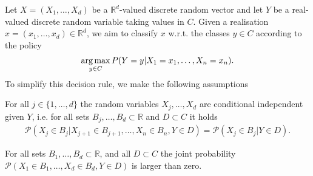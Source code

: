 Let $X=(X_{1}, \ldots, X_{d})$ be a $\mathbb{R}^{d}$-valued discrete random vector and let $Y$ be a real-valued discrete random variable taking values in $C$. Given a realisation $x = (x_{1}, \ldots, x_{d})\in\mathbb{R}^{d}$, we aim to classify $x$ w.r.t. the classes $y\in C$ according to the policy
\begin{align}\label{eq:dec_rule}
	\operatorname*{arg\,max}_{y\in C} P(Y = y | X_{1} = x_{1}, \ldots, X_{n} = x_{n}).
\end{align}
To simplify this decision rule, we make the following assumptions

\begin{myAssmptn}\label{assmptn:cond_independence}
For all $j\in\{1, \ldots, d\}$ the random variables $X_{j}, \ldots, X_{d}$ are conditional independent given $Y$, i.e. for all sets $B_{j}, \ldots, B_{d} \subset\mathbb{R}$ and $D\subset C$ it holds
 	\begin{align*}
  	\mathcal{P}(X_{j}\in B_{j} | X_{j + 1}\in B_{j + 1}, \ldots, X_{n}\in B_{n}, Y\in D) 
		= \mathcal{P}(X_{j}\in B_{j} | Y\in D).
 	\end{align*}
\end{myAssmptn}

\begin{myAssmptn}\label{assmptn:joint_prob}
  For all sets $B_{1}, \ldots, B_{d}\subset\mathbb{R}$, and all $D\subset C$ the joint probability 
  $\mathcal{P}(X_{1}\in B_{1}, \ldots, X_{d}\in B_{d}, Y\in D )$ is larger than zero.
\end{myAssmptn}

